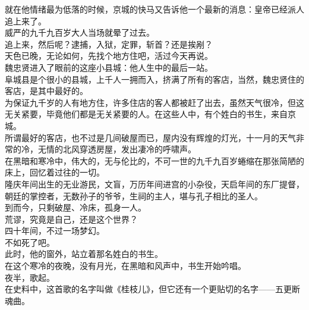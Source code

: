 \begin{multicols}{\theparacolNo}
就在他情绪最为低落的时候，京城的快马又告诉他一个最新的消息：皇帝已经派人追上来了。\\

威严的九千九百岁大人当场就晕了过去。\\

追上来，然后呢？逮捕，入狱，定罪，斩首？还是挨剐？\\

天色已晚，无论如何，先找个地方住吧，活过今天再说。\\

魏忠贤进入了眼前的这座小县城：他人生中的最后一站。\\

阜城县是个很小的县城，上千人一拥而入，挤满了所有的客店，当然，魏忠贤住的客店，是其中最好的。\\

为保证九千岁的人有地方住，许多住店的客人都被赶了出去，虽然天气很冷，但这无关紧要，毕竟他们都是无关紧要的人。在这些人中，有个姓白的书生，来自京城。\\

所谓最好的客店，也不过是几间破屋而已，屋内没有辉煌的灯光，十一月的天气非常的冷，无情的北风穿透房屋，发出凄冷的呼啸声。\\

在黑暗和寒冷中，伟大的，无与伦比的，不可一世的九千九百岁蜷缩在那张简陋的床上，回忆着过往的一切。\\

隆庆年间出生的无业游民，文盲，万历年间进宫的小杂役，天启年间的东厂提督，朝廷的掌控者，无数孙子的爷爷，生祠的主人，堪与孔子相比的圣人。\\

到而今，只剩破屋、冷床，孤身一人。\\

荒谬，究竟是自己，还是这个世界？\\

四十年间，不过一场梦幻。\\

不如死了吧。\\

此时，他的窗外，站立着那名姓白的书生。\\

在这个寒冷的夜晚，没有月光，在黑暗和风声中，书生开始吟唱。\\

夜半，歌起。\\

在史料中，这首歌的名字叫做《桂枝儿》，但它还有一个更贴切的名字——五更断魂曲。\\


\end{multicols}
